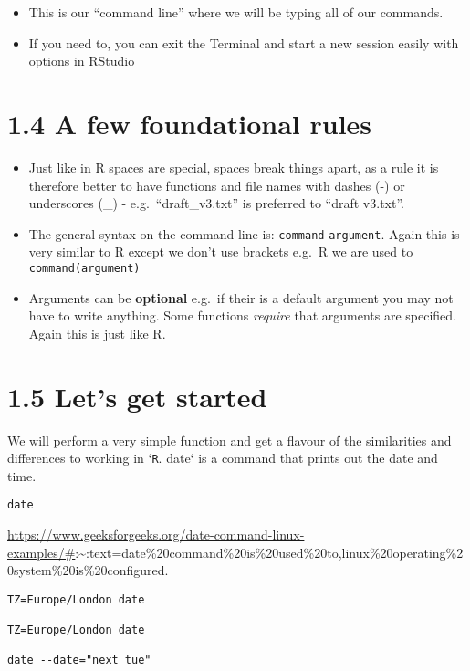 \documentclass[
]{book}
\begin{document}
\begin{itemize}
\item
  This is our ``command line'' where we will be typing all of our commands.
\item
  If you need to, you can exit the Terminal and start a new session easily with options in RStudio
\end{itemize}

\hypertarget{a-few-foundational-rules}{%
\section{1.4 A few foundational rules}\label{a-few-foundational-rules}}

\begin{itemize}
\item
  Just like in R spaces are special, spaces break things apart, as a rule it is therefore better to have functions and file names with dashes (-) or underscores (\_) - e.g.~``draft\_v3.txt'' is preferred to ``draft v3.txt''.
\item
  The general syntax on the command line is: \texttt{command} \texttt{argument}. Again this is very similar to R except we don't use brackets e.g.~R we are used to \texttt{command(argument)}
\item
  Arguments can be \textbf{optional} e.g.~if their is a default argument you may not have to write anything. Some functions \emph{require} that arguments are specified. Again this is just like R.
\end{itemize}

\hypertarget{lets-get-started}{%
\section{1.5 Let's get started}\label{lets-get-started}}

We will perform a very simple function and get a flavour of the similarities and differences to working in `\texttt{R}. date` is a command that prints out the date and time.

\begin{verbatim}
date
\end{verbatim}

\url{https://www.geeksforgeeks.org/date-command-linux-examples/\#}:\textasciitilde:text=date\%20command\%20is\%20used\%20to,linux\%20operating\%20system\%20is\%20configured.

\begin{verbatim}
TZ=Europe/London date

TZ=Europe/London date

date --date="next tue"
\end{verbatim}
\end{document}
